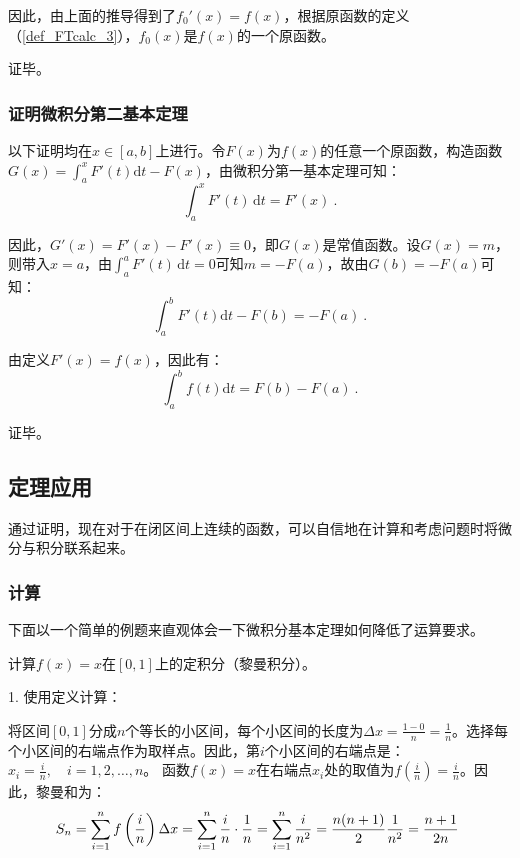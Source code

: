 因此，由上面的推导得到了$f_0'(x)=f(x)$，根据原函数的定义（\autoref{def_FTcalc_3}），$f_0(x)$是$f(x)$的一个原函数。

证毕。

\subsubsection{证明微积分第二基本定理}

以下证明均在$x\in[a,b]$上进行。令$F(x)$为$f(x)$的任意一个原函数，构造函数$G(x)=\int_{a}^{x} F'(t)\mathrm {d}t-F(x)$，由微积分第一基本定理可知：
\begin{equation}
\int_{a}^{x} F'(t)\, \mathrm {d}t=F'(x)~.
\end{equation}

因此，$G'(x)=F'(x)-F'(x)\equiv0$，即$G(x)$是常值函数。设$G(x)=m$，则带入$x=a$，由$\int_{a}^{a} F'(t)\, \mathrm {d}t=0$可知$m=-F(a)$，故由$G(b)=-F(a)$可知：
\begin{equation}
\int_{a}^{b} F'(t)\mathrm {d}t-F(b)=-F(a)~.
\end{equation}

由定义$F'(x)=f(x)$，因此有：
\begin{equation}
\int_{a}^{b} f(t)\mathrm {d}t=F(b)-F(a)~.
\end{equation}

证毕。

\subsection{定理应用}

通过证明，现在对于在闭区间上连续的函数，可以自信地在计算和考虑问题时将微分与积分联系起来。

\subsubsection{计算}

下面以一个简单的例题来直观体会一下微积分基本定理如何降低了运算要求。

\begin{example}{}
计算$f(x)=x$在$[0,1]$上的定积分（黎曼积分）。
\end{example}

1. 使用定义计算：

将区间$[0, 1]$分成$n$个等长的小区间，每个小区间的长度为$\Delta x = \frac{1 - 0}{n} = \frac{1}{n}$。选择每个小区间的右端点作为取样点。因此，第$i$个小区间的右端点是：$x_i = \frac{i}{n}, \quad i = 1, 2, \ldots, n$。
函数$f(x) = x$在右端点$x_i$处的取值为$f\left(\frac{i}{n} \right)=\frac{i}{n}$。因此，黎曼和为：
\begin{equation}
S_n = \sum_{i=1}^n f\left( \frac{i}{n} \right) \Delta x = \sum_{i=1}^n \frac{i}{n} \cdot \frac{1}{n} = \sum_{i=1}^n \frac{i}{n^2}=\frac{n(n+1)}{2}{1\over n^2} = \frac{n+1}{2n}~
\end{equation}

